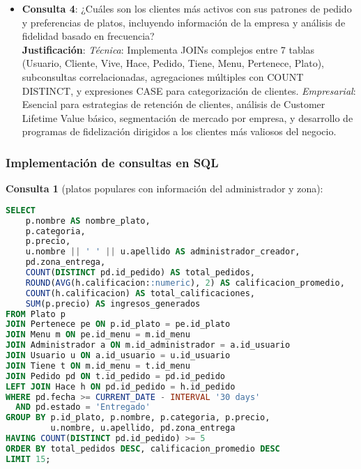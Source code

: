 \documentclass[12pt,a4paper]{article}
\begin{document}
\begin{itemize}
    \item \textbf{Consulta 4}: ¿Cuáles son los clientes más activos con sus patrones de pedido y preferencias de platos, incluyendo información de la empresa y análisis de fidelidad basado en frecuencia?\\
    \textbf{Justificación}: \textit{Técnica}: Implementa JOINs complejos entre 7 tablas (Usuario, Cliente, Vive, Hace, Pedido, Tiene, Menu, Pertenece, Plato), subconsultas correlacionadas, agregaciones múltiples con COUNT DISTINCT, y expresiones CASE para categorización de clientes. \textit{Empresarial}: Esencial para estrategias de retención de clientes, análisis de Customer Lifetime Value básico, segmentación de mercado por empresa, y desarrollo de programas de fidelización dirigidos a los clientes más valiosos del negocio.
\end{itemize}

\subsubsection{Implementación de consultas en SQL}

\textbf{Consulta 1} (platos populares con información del administrador y zona):
\begin{lstlisting}[language=SQL]
SELECT 
    p.nombre AS nombre_plato,
    p.categoria,
    p.precio,
    u.nombre || ' ' || u.apellido AS administrador_creador,
    pd.zona_entrega,
    COUNT(DISTINCT pd.id_pedido) AS total_pedidos,
    ROUND(AVG(h.calificacion::numeric), 2) AS calificacion_promedio,
    COUNT(h.calificacion) AS total_calificaciones,
    SUM(p.precio) AS ingresos_generados
FROM Plato p
JOIN Pertenece pe ON p.id_plato = pe.id_plato
JOIN Menu m ON pe.id_menu = m.id_menu
JOIN Administrador a ON m.id_administrador = a.id_usuario
JOIN Usuario u ON a.id_usuario = u.id_usuario
JOIN Tiene t ON m.id_menu = t.id_menu
JOIN Pedido pd ON t.id_pedido = pd.id_pedido
LEFT JOIN Hace h ON pd.id_pedido = h.id_pedido
WHERE pd.fecha >= CURRENT_DATE - INTERVAL '30 days'
  AND pd.estado = 'Entregado'
GROUP BY p.id_plato, p.nombre, p.categoria, p.precio, 
         u.nombre, u.apellido, pd.zona_entrega
HAVING COUNT(DISTINCT pd.id_pedido) >= 5
ORDER BY total_pedidos DESC, calificacion_promedio DESC
LIMIT 15;
\end{lstlisting}
\end{document}
